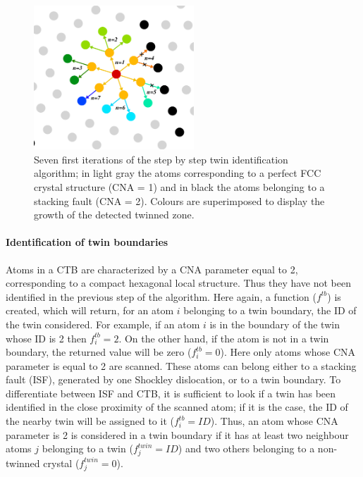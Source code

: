 \documentclass[final,3p,times,twocolumn]{elsarticle}
\begin{document}
\begin{figure}[!h]
	\begin{center}
		\includegraphics[width=60mm]{Pic/fig_A1.eps} 
	\end{center}
	\caption{Seven first iterations of the step by step twin identification algorithm; in light gray the atoms corresponding to a perfect FCC crystal structure (CNA = 1) and in black the atoms belonging to a stacking fault (CNA = 2). Colours are superimposed to display the growth of the detected twinned zone.}\label{fig_A1}
\end{figure}

\paragraph{Identification of twin boundaries}
Atoms in a CTB are characterized by a CNA parameter equal to 2, corresponding to a compact hexagonal local structure. Thus they have not been identified in the previous step of the algorithm. Here again, a function ($ f^{tb} $) is created, which will return, for an atom $ i $ belonging to a twin boundary, the ID of the twin considered. For example, if an atom $ i $ is in the boundary of the twin whose ID is 2 then $ f^{tb}_{i}=2 $. On the other hand, if the atom is not in a twin boundary, the returned value will be zero ($ f^{tb}_{i}=0 $). Here only atoms whose CNA parameter is equal to 2 are scanned. These atoms can belong either to a stacking fault (ISF), generated by one Shockley dislocation, or to a twin boundary. To differentiate between ISF and CTB, it is sufficient to look if a twin has been identified in the close proximity of the scanned atom; if it is the case, the ID of the nearby twin will be assigned to it ($ f^{tb}_{i}=ID $). Thus, an atom whose CNA parameter is 2 is considered in a twin boundary if it has at least two neighbour atoms $ j $ belonging to a twin ($ f^{twin}_{j}=ID $) and two others belonging to a non-twinned crystal ($ f^{twin}_{j}=0 $). 
\end{document}
